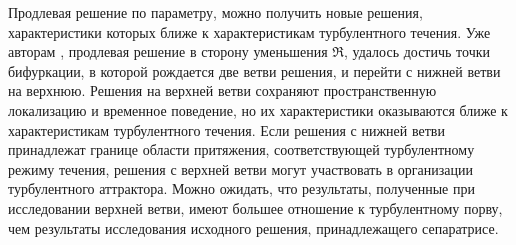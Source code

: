 Продлевая решение \cite{Avila2013} по параметру, можно получить новые решения, характеристики которых ближе к характеристикам турбулентного течения. Уже авторам \cite{Avila2013}, продлевая решение в сторону уменьшения $\Re$, удалось достичь точки бифуркации, в которой рождается две ветви решения, и перейти с нижней ветви на верхнюю. Решения на верхней ветви сохраняют пространственную локализацию и временное поведение, но их характеристики оказываются ближе к характеристикам турбулентного течения. Если решения с нижней ветви принадлежат границе области притяжения, соответствующей турбулентному режиму течения, решения с верхней ветви могут участвовать в организации турбулентного аттрактора. Можно ожидать, что результаты, полученные при исследовании верхней ветви, имеют большее отношение к турбулентному порву, чем результаты исследования исходного решения, принадлежащего сепаратрисе. 


